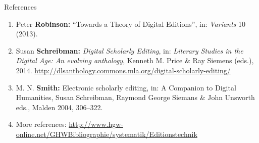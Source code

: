 \begin{frame}[allowframebreaks]{References}
\begin{enumerate}
    \item Peter \textbf{Robinson:} ``Towards a Theory of Digital Editions'', in: \emph{Variants} 10 (2013).
    \item Susan \textbf{Schreibman:} \emph{Digital Scholarly Editing}, in: \emph{Literary Studies in the Digital Age: An evolving anthology}, Kenneth M. Price \& Ray Siemens (eds.), 2014.  \protect\url{http://dlsanthology.commons.mla.org/digital-scholarly-editing/}
    \item M. N. \textbf{Smith:} Electronic scholarly editing, in: A Companion to Digital Humanities, Susan Schreibman, Raymond George Siemans \& John Unsworth eds., Malden 2004, 306--322.
    \item More references: \protect\url{http://www.hgw-online.net/GHWBibliographie/systematik/Editionstechnik}
\end{enumerate}

\end{frame}

